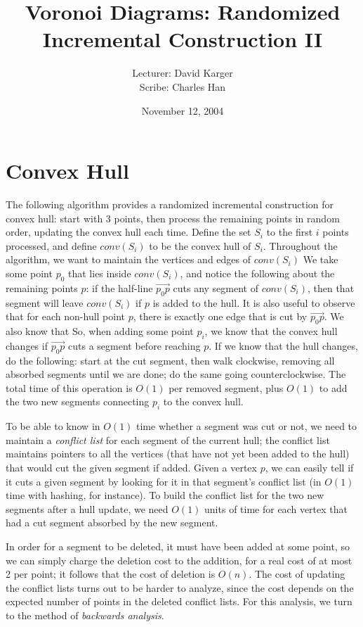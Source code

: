 \documentclass{article}
\title{Voronoi Diagrams: Randomized Incremental Construction II}
\date{November 12, 2004}
\author{Lecturer: David Karger\\ Scribe: Charles Han}
\begin{document}
\section{Convex Hull}
The following algorithm provides a randomized incremental construction for convex hull: start with 3 points, 
then process the remaining points in random order, updating the convex hull each time.  Define the set $S_{i}$ 
to the first $i$ points processed, and define $conv(S_{i})$ to be the convex hull of $S_{i}$.  Throughout the algorithm, 
we want to maintain the vertices and edges of $conv(S_{i})$  We take some point $p_{0}$ that lies inside $conv(S_{i})$, 
and notice the following about the remaining points $p$: if the half-line $\overrightarrow{p_{0}p}$ cuts any segment 
of $conv(S_{i})$, then that segment will leave $conv(S_{i})$ if $p$ is added to the hull.  It is also useful to observe that 
for each non-hull point $p$, there is exactly one edge that is cut by $\overrightarrow{p_{0}p}$.  We also know that So, when 
adding some point $p_{i}$, we know that the convex hull changes if $\overrightarrow{p_{0}p}$ cuts a segment before reaching $p$.  
If we know that the hull changes, do the following: start at the cut segment, then walk clockwise, removing all absorbed segments 
until we are done; do the same going counterclockwise.  The total time of this operation is $O(1)$ per removed segment, 
plus $O(1)$ to add the two new segments connecting $p_{i}$ to the convex hull.

To be able to know in $O(1)$ time whether a segment was cut or not, we need to maintain a \emph{conflict list} for each segment 
of the current hull; the conflict list maintains pointers to all the vertices (that have not yet been added to the hull) that 
would cut the given segment if added.  Given a vertex $p$, we can easily tell if it cuts a given segment by looking for it in that 
segment's conflict list (in $O(1)$ time with hashing, for instance).  To build the conflict list for the two new segments after a 
hull update, we need $O(1)$ units of time for each vertex that had a cut segment absorbed by the new segment.

In order for a segment to be deleted, it must have been added at some point, so we can simply charge the deletion cost to the addition, 
for a real cost of at most 2 per point; it follows that the cost of deletion is $O(n)$.  The cost of updating the conflict lists turns out 
to be harder to analyze, since the cost depends on the expected number of points in the deleted conflict lists.  For this analysis, we turn 
to the method of \emph{backwards analysis}.
\end{document}
